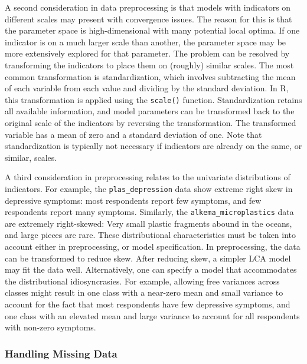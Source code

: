 \documentclass[
  ,man,floatsintext]{apa6}
\begin{document}
A second consideration in data preprocessing is that models with indicators on different scales may present with convergence issues.
The reason for this is that the parameter space is high-dimensional with many potential local optima.
If one indicator is on a much larger scale than another, the parameter space may be more extensively explored for that parameter.
The problem can be resolved by transforming the indicators to place them on (roughly) similar scales.
The most common transformation is standardization, which involves subtracting the mean of each variable from each value and dividing by the standard deviation.
In R, this transformation is applied using the \texttt{scale()} function.
Standardization retains all available information,
and model parameters can be transformed back to the original scale of the indicators by reversing the transformation.
The transformed variable has a mean of zero and a standard deviation of one.
Note that standardization is typically not necessary if indicators are already on the same, or similar, scales.

A third consideration in preprocessing relates to the univariate distributions of indicators.
For example, the \texttt{plas\_depression} data show extreme right skew in depressive symptoms:
most respondents report few symptoms,
and few respondents report many symptoms.
Similarly, the \texttt{alkema\_microplastics} data are extremely right-skewed: Very small plastic fragments abound in the oceans, and large pieces are rare.
These distributional characteristics must be taken into account either in preprocessing, or model specification.
In preprocessing, the data can be transformed to reduce skew.
After reducing skew, a simpler LCA model may fit the data well.
Alternatively,
one can specify a model that accommodates the distributional idiosyncrasies.
For example, allowing free variances across classes might result in one class with a near-zero mean and small variance to account for the fact that most respondents have few depressive symptoms,
and one class with an elevated mean and large variance to account for all respondents with non-zero symptoms.

\hypertarget{handling-missing-data}{%
\subsubsection{Handling Missing Data}\label{handling-missing-data}}
\end{document}
